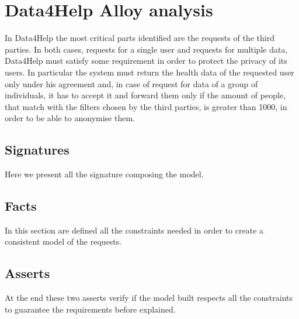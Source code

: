 \section{Data4Help Alloy analysis}

    In Data4Help the most critical parts identified are the requests of the third parties. In both cases, requests for a single user and requests for multiple data, Data4Help must satisfy some requirement in order to protect the privacy of its users.
    In particular the system must return the health data of the requested user only under his agreement and, in case of request for data of a group of individuals, it has to accept it and forward them only if the amount of people, that match with the filters chosen by the third parties, is greater than 1000, in order to be able to anonymise them.
    
    \subsection{Signatures}
    
    Here we present all the signature composing the model.
    
    

    \subsection{Facts}
 
        In this section are defined all the constraints needed in order to create a consistent model of the requests.
    
        

    \subsection{Asserts}
    
        At the end these two asserts verify if the model built respects all the constraints to guarantee the requirements before explained.
    
        






    